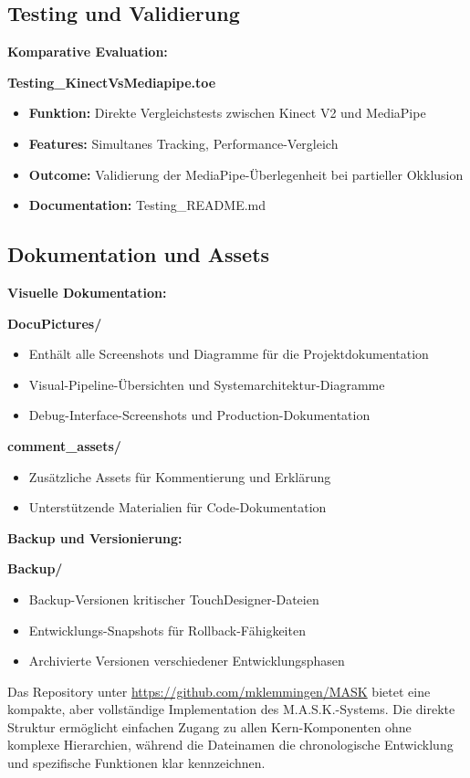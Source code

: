 \subsection{Testing und Validierung}

\textbf{Komparative Evaluation:}

\textbf{Testing\_KinectVsMediapipe.toe}
\begin{itemize}
    \item \textbf{Funktion:} Direkte Vergleichstests zwischen Kinect V2 und MediaPipe
    \item \textbf{Features:} Simultanes Tracking, Performance-Vergleich
    \item \textbf{Outcome:} Validierung der MediaPipe-Überlegenheit bei partieller Okklusion
    \item \textbf{Documentation:} Testing\_README.md
\end{itemize}

\subsection{Dokumentation und Assets}

\textbf{Visuelle Dokumentation:}

\textbf{DocuPictures/}
\begin{itemize}
    \item Enthält alle Screenshots und Diagramme für die Projektdokumentation
    \item Visual-Pipeline-Übersichten und Systemarchitektur-Diagramme
    \item Debug-Interface-Screenshots und Production-Dokumentation
\end{itemize}

\textbf{comment\_assets/}
\begin{itemize}
    \item Zusätzliche Assets für Kommentierung und Erklärung
    \item Unterstützende Materialien für Code-Dokumentation
\end{itemize}

\textbf{Backup und Versionierung:}

\textbf{Backup/}
\begin{itemize}
    \item Backup-Versionen kritischer TouchDesigner-Dateien
    \item Entwicklungs-Snapshots für Rollback-Fähigkeiten
    \item Archivierte Versionen verschiedener Entwicklungsphasen
\end{itemize}

Das Repository unter \url{https://github.com/mklemmingen/MASK} bietet eine kompakte, aber vollständige Implementation des M.A.S.K.-Systems. Die direkte Struktur ermöglicht einfachen Zugang zu allen Kern-Komponenten ohne komplexe Hierarchien, während die Dateinamen die chronologische Entwicklung und spezifische Funktionen klar kennzeichnen.